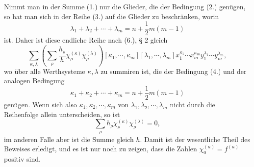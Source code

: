 \documentclass[11pt]{article}
\begin{document}
Nimmt man in der Summe (1.) nur die Glieder, die der Bedingung (2.) genügen, so hat man sich in der Reihe (3.) auf die Glieder zu beschränken, worin
\begin{equation}\tag{4.}
 \lambda_1+\lambda_2+\cdots+\lambda_m=n+\frac12m(m-1)
\end{equation}
ist. Daher ist diese endliche Reihe nach (6.), § 2 gleich
\[
 \sum_{\kappa,\lambda}\left(\sum_\rho\frac{h_\rho}{h}\chi_\rho^{(\kappa)}\chi_\rho^{(\lambda)}\right)
 [\kappa_1,\cdots,
\kappa_m][\lambda_1,\cdots,
\lambda_m]x_1^{\kappa_1}\cdots x_m^{\kappa_m}y_1^{\lambda_1}\cdots y_m^{\lambda_m},
\]
wo über alle Werthsysteme $\kappa,\lambda$ zu summiren ist, die der Bedingung (4.) und der analogen Bedingung
\[
 \kappa_1+\kappa_2+\cdots+\kappa_m=n+\frac12m(m-1)
\]
genügen. Wenn sich also $\kappa_1,\kappa_2,\cdots,
\kappa_m$ von $\lambda_1,\lambda_2,\cdots,
\lambda_m$ nicht durch die Reihenfolge allein unterscheiden, so ist
\[
 \sum_\rho h_\rho\chi_\rho^{(\kappa)}\chi_\rho^{(\lambda)}=0,
\]
im anderen Falle aber ist die Summe gleich $h$. Damit ist der wesentliche Theil des Beweises erledigt, und es ist nur noch zu zeigen, dass die Zahlen $\chi_0^{(\kappa)}=f^{(\kappa)}$ positiv sind.
\end{document}
